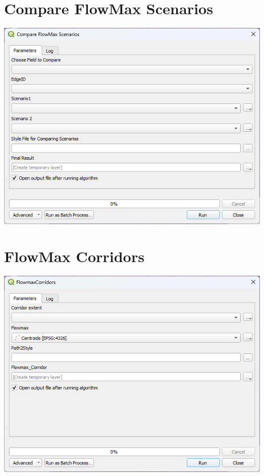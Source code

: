 \documentclass[
]{book}
\begin{document}
\section{Compare FlowMax Scenarios}\label{compare-flowmax-scenarios}

\includegraphics{./images/compare.png}

\section{FlowMax Corridors}\label{flowmax-corridors}

\includegraphics{./images/corridors.png}
\end{document}
